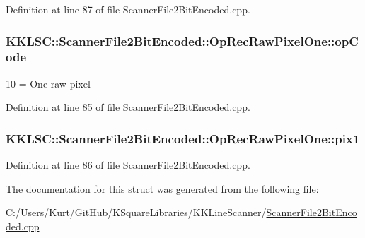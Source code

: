 Definition at line 87 of file Scanner\+File2\+Bit\+Encoded.\+cpp.

\subsubsection[{\texorpdfstring{op\+Code}{opCode}}]{ K\+K\+L\+S\+C\+::\+Scanner\+File2\+Bit\+Encoded\+::\+Op\+Rec\+Raw\+Pixel\+One\+::op\+Code}\hypertarget{struct_scanner_file2_bit_encoded_1_1_op_rec_raw_pixel_one_a895ef08371f493809f1a1584318f1795}{}\label{struct_scanner_file2_bit_encoded_1_1_op_rec_raw_pixel_one_a895ef08371f493809f1a1584318f1795}
10 = One raw pixel 

Definition at line 85 of file Scanner\+File2\+Bit\+Encoded.\+cpp.

\subsubsection[{\texorpdfstring{pix1}{pix1}}]{ K\+K\+L\+S\+C\+::\+Scanner\+File2\+Bit\+Encoded\+::\+Op\+Rec\+Raw\+Pixel\+One\+::pix1}\hypertarget{struct_scanner_file2_bit_encoded_1_1_op_rec_raw_pixel_one_a5d6b2e8bfea846b11d94b22fe7d0f0ee}{}\label{struct_scanner_file2_bit_encoded_1_1_op_rec_raw_pixel_one_a5d6b2e8bfea846b11d94b22fe7d0f0ee}


Definition at line 86 of file Scanner\+File2\+Bit\+Encoded.\+cpp.



The documentation for this struct was generated from the following file\+:\begin{DoxyCompactItemize}
\item 
C\+:/\+Users/\+Kurt/\+Git\+Hub/\+K\+Square\+Libraries/\+K\+K\+Line\+Scanner/\hyperlink{_scanner_file2_bit_encoded_8cpp}{Scanner\+File2\+Bit\+Encoded.\+cpp}\end{DoxyCompactItemize}
